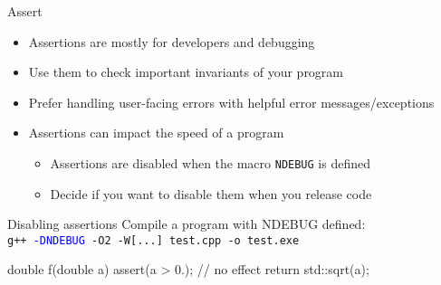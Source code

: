 \begin{frame}[fragile]
  \begin{goodpractice}{Assert}
    \begin{itemize}
      \item Assertions are mostly for developers and debugging
      \item Use them to check important invariants of your program
      \item Prefer handling user-facing errors with helpful error messages/exceptions
      \item Assertions can impact the speed of a program
      \begin{itemize}
        \item Assertions are disabled when the macro \texttt{NDEBUG} is defined
        \item Decide if you want to disable them when you release code
      \end{itemize}
    \end{itemize}
  \end{goodpractice}
  \begin{exampleblock}{Disabling assertions}
    \small
    Compile a program with NDEBUG defined:\\
    \texttt{g++ \textcolor{blue}{-DNDEBUG} -O2 -W[...] test.cpp -o test.exe}

    \begin{cppcode*}{}
      double f(double a) {
        assert(a > 0.); // no effect
        return std::sqrt(a);
      }
    \end{cppcode*}
  \end{exampleblock}
\end{frame}

